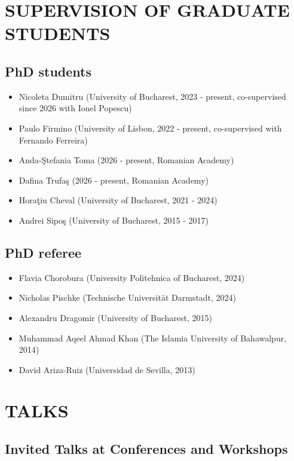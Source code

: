 \documentclass[12pt]{article}
\begin{document}
\section*{SUPERVISION OF GRADUATE STUDENTS}

\subsection*{PhD students}

\begin{itemize}
\item Nicoleta Dumitru (University of Bucharest, 2023 - present, co-supervised since 2026 with Ionel Popescu)
\item Paulo Firmino (University of Lisbon,  2022 - present, co-supervised with Fernando Ferreira)
\item  Anda-\c Stefania Toma (2026 - present, Romanian Academy)
\item  Dafina Trufa\c s (2026 - present, Romanian Academy)
\item Hora\c{t}iu Cheval (University of Bucharest, 2021 - 2024)
 \item Andrei Sipo\c s (University of Bucharest,  2015 - 2017)
 \end{itemize}
 
 \subsection*{PhD referee}
 
\begin{itemize}
\item Flavia Chorobura (University Politehnica of Bucharest, 2024)
\item Nicholas Pischke (Technische Universit\" at Darmstadt, 2024)
\item Alexandru Dragomir (University of Bucharest,  2015)
 \item Muhammad Aqeel Ahmad Khan (The Islamia University of Bahawalpur, 2014)
 \item David Ariza-Ruiz (Universidad de Sevilla, 2013)
\end{itemize}


\section*{TALKS}

\subsection*{Invited Talks at Conferences and Workshops}
\end{document}
